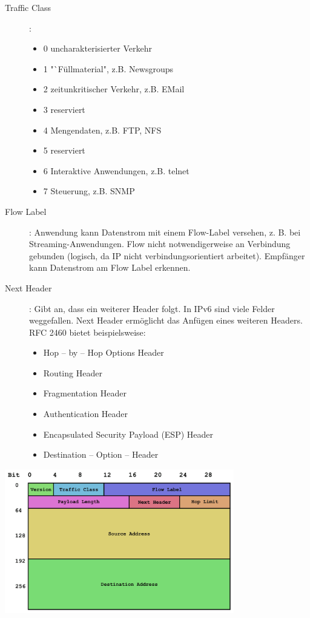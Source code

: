 \documentclass{article} %
\begin{document}
\begin{description}
	\item [Traffic Class]: \begin{itemize}
		\item 0 uncharakterisierter Verkehr
		\item 1 "`Füllmaterial", z.B. Newsgroups
		\item 2 zeitunkritischer Verkehr, z.B. EMail
		\item 3 reserviert
		\item 4 Mengendaten, z.B. FTP, NFS
		\item 5 reserviert
		\item 6 Interaktive Anwendungen, z.B. telnet
		\item 7 Steuerung, z.B. SNMP
	\end{itemize}
	\item [Flow Label]: Anwendung kann Datenstrom mit einem Flow-Label versehen, z. B. bei Streaming-Anwendungen.
	Flow nicht notwendigerweise an Verbindung gebunden (logisch, da IP nicht verbindungsorientiert arbeitet).
	Empfänger kann Datenstrom am Flow Label erkennen. \cite{rfc3697, rfc6437}
	\item[Next Header]: Gibt an, dass ein weiterer Header folgt.
	In IPv6 sind viele Felder weggefallen.
	Next Header ermöglicht das Anfügen eines weiteren Headers.
	RFC 2460\cite{rfc2460} bietet beispielsweise:
	\begin{itemize}
		\item Hop – by – Hop Options Header
		\item Routing Header
		\item Fragmentation Header
		\item Authentication Header
		\item Encapsulated Security Payload (ESP) Header
		\item Destination – Option – Header
	\end{itemize}
	 
\end{description}

\begin{center}
	\includegraphics[width=10cm]{img/IPv6_header}
\end{center}
\end{document}
